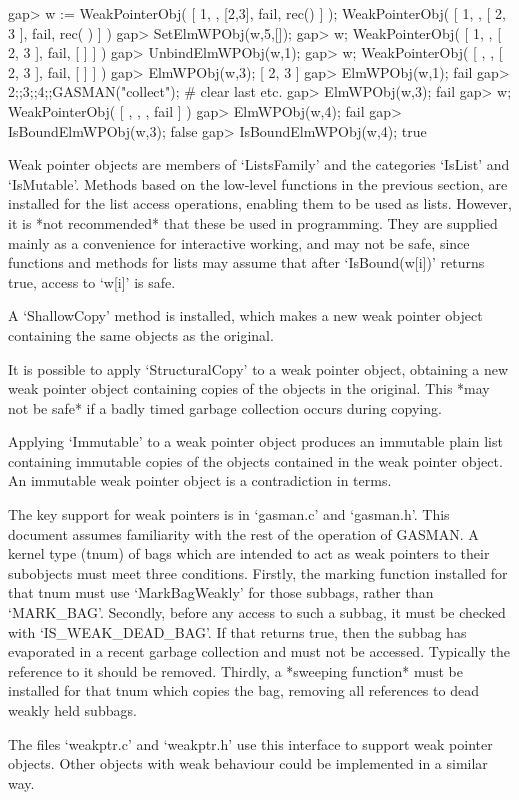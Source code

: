 \beginexample
gap> w := WeakPointerObj( [ 1, , [2,3], fail, rec() ] );   
WeakPointerObj( [ 1, , [ 2, 3 ], fail, rec(  ) ] )
gap> SetElmWPObj(w,5,[]);
gap> w;
WeakPointerObj( [ 1, , [ 2, 3 ], fail, [  ] ] )
gap> UnbindElmWPObj(w,1);
gap> w;
WeakPointerObj( [ , , [ 2, 3 ], fail, [  ] ] )
gap> ElmWPObj(w,3);      
[ 2, 3 ]
gap> ElmWPObj(w,1);
fail
gap> 2;;3;;4;;GASMAN("collect"); # clear last etc.
gap> ElmWPObj(w,3);          
fail
gap> w;
WeakPointerObj( [ , , , fail ] )
gap> ElmWPObj(w,4);
fail
gap> IsBoundElmWPObj(w,3);
false
gap> IsBoundElmWPObj(w,4);
true
\endexample
    

Weak pointer objects are members of `ListsFamily' and the categories `IsList'
and `IsMutable'.  Methods based  on  the low-level functions in  the previous
section, are  installed for the list  access operations,  enabling them to be
used as lists.    However, it is  *not recommended*  that  these be used   in
programming. They   are  supplied mainly as   a convenience  for  interactive
working, and   may not be   safe, since functions  and methods  for lists may
assume that after `IsBound(w[i])' returns true, access to `w[i]' is safe.


A `ShallowCopy'  method is installed, which  makes a  new weak pointer object
containing the same objects as the original.

It is possible to apply `StructuralCopy'  to a weak pointer object, obtaining
a new weak  pointer object containing copies of  the objects in the original. 
This *may  not  be safe*  if a  badly timed garbage  collection occurs during
copying.

Applying `Immutable'  to a weak   pointer object produces an  immutable plain
list containing immutable copies of the objects contained in the weak pointer
object. An immutable weak pointer object is a contradiction in terms.
    

The  key support for  weak  pointers is in   `gasman.c' and `gasman.h'.  This
document assumes  familiarity  with the rest of  the operation of  GASMAN.  A
kernel type (tnum) of   bags which are  intended  to act as weak  pointers to
their  subobjects must meet  three conditions.  Firstly, the marking function
installed for that tnum must  use  `MarkBagWeakly' for those subbags,  rather
than `MARK_BAG'.  Secondly,  before any access to  such a subbag, it must be
checked with `IS_WEAK_DEAD_BAG'. If that   returns true, then the subbag  has
evaporated in a recent garbage collection and must not be accessed. Typically
the reference to it should be removed. Thirdly, a *sweeping function* must be
installed for that tnum which copies the bag, removing all references to dead
weakly held subbags.

The  files `weakptr.c' and  `weakptr.h'  use this  interface  to support weak
pointer objects. Other objects with weak behaviour  could be implemented in a
similar way.


